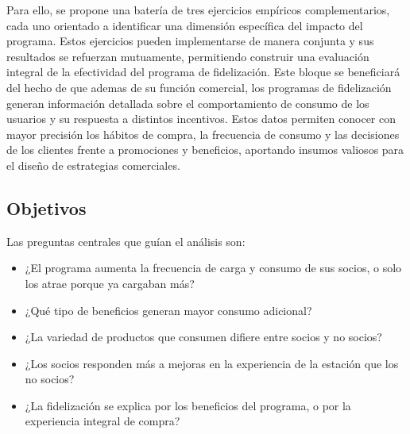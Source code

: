 Para ello, se propone una batería de tres ejercicios empíricos complementarios, cada uno orientado a identificar una dimensión específica del impacto del programa. Estos ejercicios pueden implementarse de manera conjunta y sus resultados se refuerzan mutuamente, permitiendo construir una evaluación integral de la efectividad del programa de fidelización. Este bloque se beneficiará del hecho de que ademas de su función comercial, los programas de fidelización generan información detallada sobre el comportamiento de consumo de los usuarios y su respuesta a distintos incentivos. Estos datos permiten conocer con mayor precisión los hábitos de compra, la frecuencia de consumo y las decisiones de los clientes frente a promociones y beneficios, aportando insumos valiosos para el diseño de estrategias comerciales.







\subsection{Objetivos}
Las preguntas centrales que guían el análisis son:


\begin{itemize}
    \item ¿El programa aumenta la frecuencia de carga y consumo de sus socios, o solo los atrae porque ya cargaban más?
    \item ¿Qué tipo de beneficios generan mayor consumo adicional?
    \item ¿La variedad de productos que consumen difiere entre socios y no socios?
    \item ¿Los socios responden más a mejoras en la experiencia de la estación que los no socios?
    \item ¿La fidelización se explica por los beneficios del programa, o por la experiencia integral de compra?
\end{itemize}

